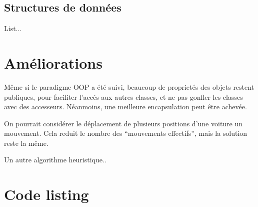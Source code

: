 \documentclass[11pt,a4paper]{article}
\begin{document}
\subsection{Structures de données}

List...

\section{Améliorations}

Même si le paradigme OOP a été suivi, beaucoup de proprietés des
objets restent publiques, pour faciliter l'accés aux autres classes,
et ne pas gonfler les classes avec des accesseurs. Néanmoins, une
meilleure encapsulation peut être achevée.

On pourrait considérer le déplacement de plusieurs positions d'une
voiture un mouvement. Cela reduit le nombre des ``mouvements effectifs'',
mais la solution reste la même.

Un autre algorithme heuristique..


\newpage

\section{Code listing}


\newpage

\newpage

\newpage

\newpage

\newpage

\end{document}

